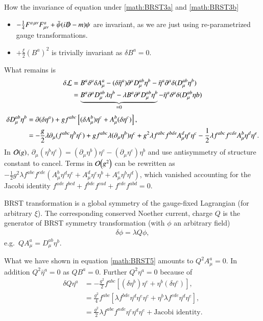 How the invariance of equation under \ref{math:BRST3a} and \ref{math:BRST3b}
\begin{itemize}
   \item $-\frac{1}{4} F^{a\, \mu\nu} F^a_{\mu\nu} + \bar\psi (i \slashed{D} - m) \psi$ are invariant, as we are just using re-parametrized gauge transformations.
   \item $+ \frac{\xi}{2} (B^a)^2$ is trivially invariant as $\delta B^a = 0$.
\end{itemize}
What remains is
\begin{align}
   \delta \mathcal{L} &= B^a \delta^\mu \delta A^a_\mu -  (\delta \bar \eta^a) \partial^\mu D_\mu^{ab} \eta^b - \bar\eta^a \partial^\mu \delta(D^{ab}_\mu \eta^b)  \notag \\
            &= \underbrace{B^a \partial^\mu D_\mu^{ab} \lambda \eta^b - \lambda B^a \partial^\mu D_\mu^{ab} \eta^b}_{=0} - \bar{\eta}^a \delta^\mu \delta(D_\mu^{ab} \eta b )  \label{math:BRST4}
\end{align}
\begin{align}
   \delta D_\mu^{ab} \eta^b &= \partial(\delta \eta^a) + g f^{abc} \left[ (\delta A_\mu^b) \eta^c + A_\mu^b (\delta \eta^c) \right], \notag \\
                         &= - \frac{g}{2} \lambda \partial_\mu (f^{abc} \eta^b \eta^c ) + g f^{abc} \lambda (\partial_\mu \eta^b) \eta^c + g^2 \lambda f^{abc} f^{bde} A_\mu^d \eta^e \eta^c - \frac{1}{2} \lambda f^{abc} f^{cde} A_\mu^b \eta^d \eta^e \label{math:BRST5}.
\end{align}
In $\order{g}$, $\partial_\mu (\eta^b \eta^c) = (\partial_\mu \eta^b) \eta^c - (\partial_\mu \eta^c) \eta^b$ and use antisymmetry of structure constant to cancel.
Terms in $\order{g^2}$ can be rewritten as
$-\frac{1}{2} g^2 \lambda f^{abc} f^{cde} \left( A_\mu^b \eta^d \eta^e + A_\mu^d \eta^e \eta^b + A_\mu^e \eta^b \eta^d \right)$, which vanished accounting for the Jacobi identity
$f^{ade} f^{bcd} + f^{bde} f^{cad} + f^{cde} f^{abd} = 0 $.

BRST transformation is a global symmetry of the gauge-fixed Lagrangian (for arbitrary $\xi$). The corresponding conserved Noether current, charge $Q$ is the generator of BRST symmetry transformation (with $\phi$ an arbitrary field)
\begin{align*}
   \delta \phi = \lambda Q \phi,
\end{align*}
e.g.~$Q A_\mu^a = D_\mu^{ab} \eta^b$.

What we have shown in equation \ref{math:BRST5} amounts to $Q^2 A_\mu^a = 0$. In addition $Q^2 \bar{\eta}^a = 0$ as $Q B^a = 0$. Further $Q^2 \eta^a = 0$ because of 
\begin{align*}
   \delta Q \eta^a &= - \frac{g^2}{2} f^{abc} \left[ (\delta \eta^b) \eta^c + \eta^b (\delta \eta^c) \right],  \\
                   &= \frac{g^2}{4} f^{abc} \left[ \lambda f^{bde} \eta^d \eta^e \eta^c + \eta^b \lambda f^{cde} \eta^d \eta^e \right], \\
                   &= \frac{g^2}{2} \lambda f^{abc} f^{nde} \eta^c \eta^d \eta^e + \text{Jacobi identity}.
\end{align*}

